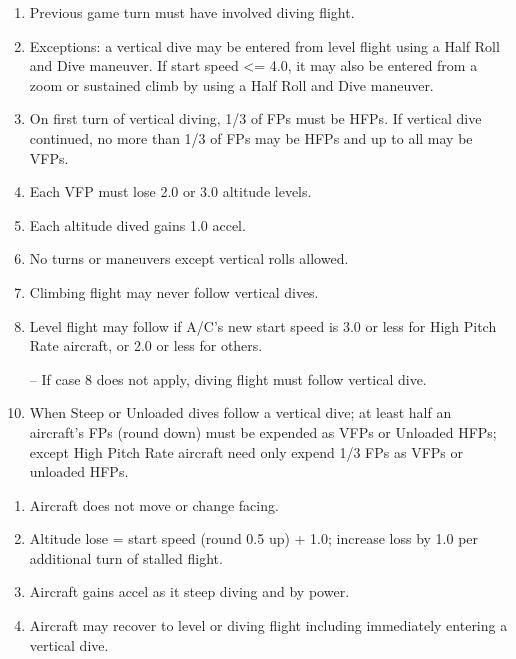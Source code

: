 \begin{table*}
\begin{multicols}{2}
\begin{enumerate}[nosep]
    \item Previous game turn must have involved diving flight.
    \item Exceptions: a vertical dive may be entered from level flight using a Half Roll and Dive maneuver. If start speed <= 4.0, it may also be entered from a zoom or sustained climb by using a Half Roll and Dive maneuver.
    \item On first turn of vertical diving, 1/3 of FPs must be HFPs. If vertical dive continued, no more than 1/3 of FPs may be HFPs and up to all may be VFPs.
    \item Each VFP must lose 2.0 or 3.0 altitude levels.
    \item Each altitude dived gains 1.0 accel.
    \item No turns or maneuvers except vertical rolls allowed.
    \item Climbing flight may never follow vertical dives.
    \item Level flight may follow if A/C's new start speed is 3.0 or less for High Pitch Rate aircraft, or 2.0 or less for others.
    \item[--] If case 8 does not apply, diving flight must follow vertical dive.
    \item When Steep or Unloaded dives follow a vertical dive; at least half an aircraft's FPs (round down) must be expended as VFPs or Unloaded HFPs; except High Pitch Rate aircraft need only expend 1/3 FPs as VFPs or unloaded HFPs.
\end{enumerate}


\begin{enumerate}[nosep]
    \item Aircraft does not move or change facing.
    \item Altitude lose = start speed (round 0.5 up) + 1.0; increase loss by 1.0 per additional turn of stalled flight.
    \item Aircraft gains accel as it steep diving and by power.
    \item Aircraft may recover to level or diving flight including immediately entering a vertical dive.
\end{enumerate}



\end{multicols}
\end{table*}
